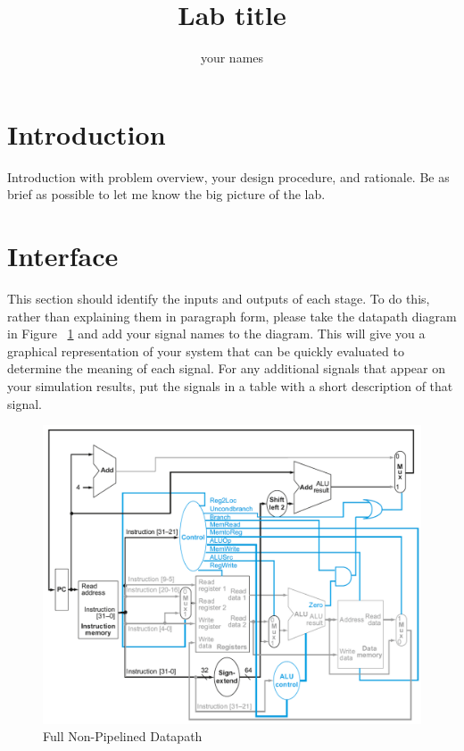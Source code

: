 \documentclass{article}
\author{your names}
\title{Lab title}
\begin{document}
\maketitle

\section{Introduction}
Introduction with problem overview, your design procedure, and rationale.  Be as brief as possible to let me know the big picture of the lab.

\section{Interface}
This section should identify the inputs and outputs of each stage.  To do this, rather than explaining them in paragraph form, please take the datapath diagram in Figure ~\ref{fig:datapath} and add your signal names to the diagram.  This will give you a graphical representation of your system that can be quickly evaluated to determine the meaning of each signal.  For any additional signals that appear on your simulation results, put the signals in a table with a short description of that signal.

\begin{figure}
	\caption{Full Non-Pipelined Datapath}\label{fig:datapath}
	\begin{center}
		\includegraphics[width=\textwidth]{../images/non_pipelined_datapath.png}
	\end{center}
\end{figure}
\end{document}
